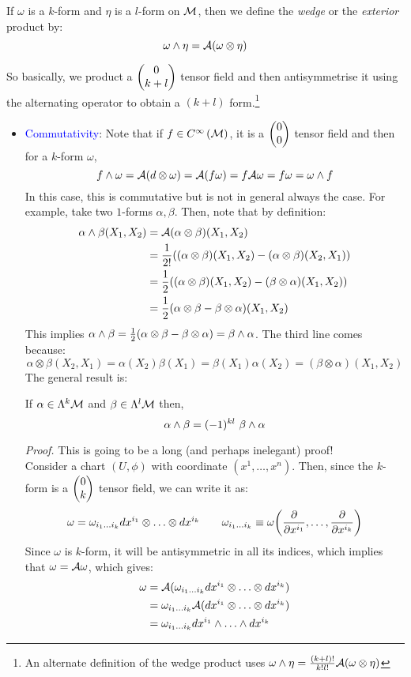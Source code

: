 \begin{definition}
    If $\omega$ is a $k$-form and $\eta$ is a $l$-form on $\mathcal M$, then we define the \textit{wedge} or the \textit{exterior} product by:
    $$\omega \wedge \eta = \mathcal A(\omega \otimes \eta)$$
\end{definition}
So basically, we product a $\mqty(0\\k+l)$ tensor field and then antisymmetrise it using the alternating operator to obtain a $(k+l)$  form.\footnote{An alternate definition of the wedge product uses $\omega \wedge \eta =\frac{(k+l)!}{k!l!} \mathcal A(\omega \otimes \eta)$}\\[0.2cm]
\begin{itemize}
    \item \textcolor{blue}{Commutativity}: Note that if $f\in C^{\infty}\left(\mathcal M\right)$, it is a $\mqty(0\\0)$ tensor field and then for a $k$-form $\omega$, $$f \wedge \omega = \mathcal A(d\otimes \omega) = \mathcal A(f\omega)=f\mathcal A \omega = f\omega = \omega \wedge f$$
    In this case, this is commutative but is not in general always the case. For example, take two $1$-forms $\alpha,\beta$. Then, note that by definition:
    \begin{align*}
        \alpha \wedge \beta(X_1,X_2) &= \mathcal A(\alpha\otimes \beta)(X_1,X_2)\\
        &=\frac{1}{2!}\qty((\alpha\otimes \beta)(X_1,X_2)-(\alpha\otimes \beta)(X_2,X_1))\\
        &=\frac{1}{2}\qty((\alpha\otimes \beta)(X_1,X_2)-(\beta\otimes \alpha)(X_1,X_2))\\
        &=\frac{1}{2}(\alpha\otimes \beta - \beta\otimes \alpha) (X_1,X_2)
    \end{align*}
    This implies $ \alpha \wedge \beta = \frac{1}{2}(\alpha\otimes \beta - \beta\otimes \alpha) = \beta \wedge \alpha$. The third line comes because:
    $$\alpha\otimes \beta (X_2,X_1) = \alpha(X_2)\beta(X_1) = \beta(X_1)\alpha(X_2)=(\beta\otimes \alpha)(X_1,X_2)$$
    The general result is:\begin{lemma}
        If $\alpha\in \Lambda^k\mathcal M$ and $\beta\in \Lambda^l\mathcal M$ then,
    $$\ext{\alpha}{\beta} = (-1)^{kl}\ \ext{\beta}{\alpha}$$
    \end{lemma}
    \textit{Proof.} This is going to be a long (and perhaps inelegant) proof!\\[0.2cm]
    Consider a chart $(U,\phi)$ with coordinate $(x^1,\ldots,x^n)$. Then, since the $k$-form is a $\mqty(0\\k)$ tensor field, we can write it as:
    $$\omega  = \omega_{i_1\ldots i_k}dx^{i_1}\otimes\ldots\otimes dx^{i_k}\qquad \omega_{i_1\ldots i_k} \equiv \omega\qty(\pdv{x^{i_1}},\ldots,\pdv{x^{i_k}})$$
    Since $\omega$ is $k$-form, it will be antisymmetric in all its indices, which implies that $\omega = \mathcal A \omega$, which gives:
    \begin{align*}
          \omega &= \mathcal A(\omega_{i_1\ldots i_k}dx^{i_1}\otimes\ldots\otimes dx^{i_k}) \\
          &=\omega_{i_1\ldots i_k} \mathcal A(dx^{i_1}\otimes\ldots\otimes dx^{i_k})\\
          &=\omega_{i_1\ldots i_k} dx^{i_1} \wedge \ldots \wedge dx^{i_k}
    \end{align*}


\end{itemize}
